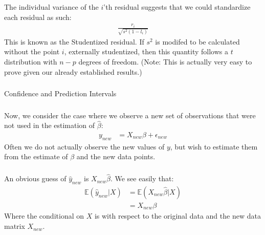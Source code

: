\begin{frame}[fragile] \frametitle{}

The individual variance of the $i$'th residual suggests that we
could standardize each residual as such:
\begin{align*}
\frac{r_i}{\sqrt{s^2 (1 - l_i)}}
\end{align*}
\pause This is known as the Studentized residual. If $s^2$ is modifed
to be calculated without the point $i$, externally studentized, then
this quantity follows a $t$ distribution with $n-p$ degrees of freedom.
(Note: This is actually very easy to prove given our already established
results.)

\end{frame}

\begin{frame}[fragile] \frametitle{}

\begin{flushright}
{\color{yaleblue}\sc\fontsize{1cm}{0cm}\selectfont Confidence and Prediction Intervals}
\end{flushright}

\end{frame}

\begin{frame}[fragile] \frametitle{}

Now, we consider the case where we observe a new set of
observations that were not used in the estimation of $\widehat{\beta}$:
\begin{align*}
y_{new} &= X_{new} \beta + \epsilon_{new}
\end{align*}
Often we do not actually observe the new values of $y$, but wish
to estimate them from the estimate of $\beta$ and the new
data points.

\end{frame}

\begin{frame}[fragile] \frametitle{}

An obvious guess of $\hat{y}_{new}$ is $X_{new} \widehat{\beta}$.
\pause We see easily that:
\begin{align*}
\mathbb{E} (\hat{y}_{new} | X) &= \mathbb{E} (X_{new} \widehat{\beta} | X) \\
&= X_{new} \beta
\end{align*}
Where the conditional on $X$ is with respect to the original data and
the new data matrix $X_{new}$.

\end{frame}

